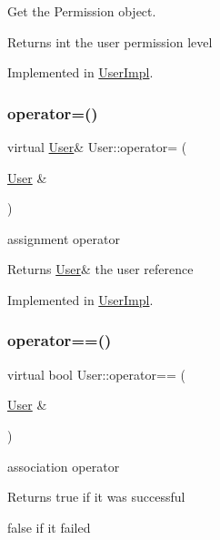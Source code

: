 Get the Permission object. 

\begin{DoxyReturn}{Returns}
int the user permission level 
\end{DoxyReturn}


Implemented in \hyperlink{classUserImpl_ac2233b5f85222b2db6a1877083374973}{User\+Impl}.

\mbox{\label{classUser_afd7134b455781d42362cf5fd0d5d2e68}} 
\subsubsection{\texorpdfstring{operator=()}{operator=()}}
{\footnotesize\ttfamily virtual \hyperlink{classUser}{User}\& User\+::operator= (\begin{DoxyParamCaption}\item[{\hyperlink{classUser}{User} \&}]{ }\end{DoxyParamCaption})\hspace{0.3cm}{\ttfamily [pure virtual]}}



assignment operator 

\begin{DoxyReturn}{Returns}
\hyperlink{classUser}{User}\& the user reference 
\end{DoxyReturn}


Implemented in \hyperlink{classUserImpl_aa89ed62b1dbd34811cf7e32137009b6d}{User\+Impl}.

\mbox{\label{classUser_a461783a03e5a694a2cdd80fba7b18459}} 
\subsubsection{\texorpdfstring{operator==()}{operator==()}}
{\footnotesize\ttfamily virtual bool User\+::operator== (\begin{DoxyParamCaption}\item[{\hyperlink{classUser}{User} \&}]{ }\end{DoxyParamCaption})\hspace{0.3cm}{\ttfamily [pure virtual]}}



association operator 

\begin{DoxyReturn}{Returns}
true if it was successful 

false if it failed 
\end{DoxyReturn}


